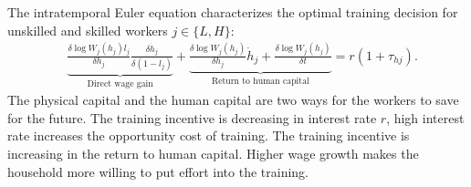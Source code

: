 \documentclass[12pt]{article}
\begin{document}
The intratemporal Euler equation characterizes the optimal training decision for unskilled and skilled workers $j\in\{L,H\}$:
\begin{align*}
&\underbrace{\frac{\delta \log W_j(h_j)l_j}{\delta h_j}\frac{\delta \dot{h}_j}{\delta (1-l_j)}}_{\text{Direct wage gain}}+\underbrace{\frac{\delta \log W_j(h_j)}{\delta h_j}\dot{h}_j+\frac{\delta \log W_j(h_j)}{\delta t}}_{\text{Return to human capital}}= r(1+\tau_{hj}).
\end{align*}
The physical capital and the human capital are two ways for the workers to save for the future. The training incentive is decreasing in interest rate $r$, high interest rate increases the opportunity cost of training. The training incentive is increasing in the return to human capital. Higher wage growth makes the household more willing to put effort into the training.
\end{document}

